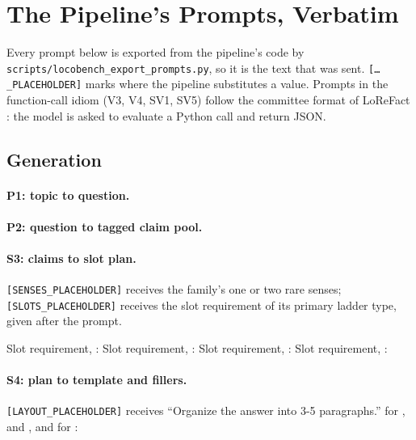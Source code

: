 
\section{The Pipeline's Prompts, Verbatim}
\label{app:prompts}

Every prompt below is exported from the pipeline's code by
\texttt{scripts/locobench\_export\_prompts.py}, so it is the text that was sent.
\texttt{[\ldots\_PLACEHOLDER]} marks where the pipeline substitutes a value. Prompts in the
function-call idiom (V3, V4, SV1, SV5) follow the committee format of LoReFact \citep{lorefact}:
the model is asked to evaluate a Python call and return JSON.

\subsection{Generation}

\paragraph{P1: topic to question.}

\paragraph{P2: question to tagged claim pool.}

\paragraph{S3: claims to slot plan.} \texttt{[SENSES\_PLACEHOLDER]} receives the family's one or
two rare senses; \texttt{[SLOTS\_PLACEHOLDER]} receives the slot requirement of its primary ladder
type, given after the prompt.

\noindent Slot requirement, :
\noindent Slot requirement, :
\noindent Slot requirement, :
\noindent Slot requirement, :

\paragraph{S4: plan to template and fillers.} \texttt{[LAYOUT\_PLACEHOLDER]} receives
``Organize the answer into 3-5 paragraphs.'' for ,  and , and for
:

